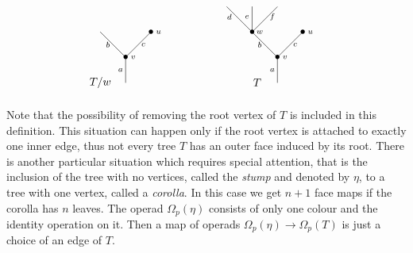 \documentclass[a4paper]{amsart}
\theoremstyle{plain}
\theoremstyle{definition}
\theoremstyle{remark}
\newcommand{\To}{\longrightarrow}
\numberwithin{equation}{section}
\numberwithin{figure}{section}
\begin{document}
\begin{equation}
    \xy<0.08cm,0cm>:
    (-10,0)*=0{}="1";
    (10,0)*=0{\bullet}="2";
    (0,-10)*=0{\bullet}="3";
    (0,-20)*=0{}="4";
    (40,10)*=0{}="5";
    (50,10)*=0{}="6";
    (60,10)*=0{}="7";
    (50,0)*=0{\bullet}="8";
    (70,0)*=0{\bullet}="9";
    (60,-10)*=0{\bullet}="10";
    (60,-20)*=0{}="11";
    (13,0)*{\scriptstyle u};
    (-7,-5)*{\scriptstyle b};
    (7,-5)*{\scriptstyle c};
    (3,-10)*{\scriptstyle v};
    (-2,-15)*{\scriptstyle a};
    (41,6)*{\scriptstyle d};
    (48,6)*{\scriptstyle e};
    (58,6)*{\scriptstyle f};
    (53,-5)*{\scriptstyle b};
    (67,-5)*{\scriptstyle c};
    (63,-10)*{\scriptstyle v};
    (58,-15)*{\scriptstyle a};
    (73,0)*{\scriptstyle u};
    (53,0)*{\scriptstyle w};
    (-10,-20)*=0{T/w};
    (-10,-25)*=0{};
    (52,-20)*=0{T};
    "1";"3" **\dir{-};
    "2";"3" **\dir{-};
    "3";"4" **\dir{-};
    "5";"8" **\dir{-};
    "6";"8" **\dir{-};
    "7";"8" **\dir{-};
    "8";"10" **\dir{-};
    "9";"10" **\dir{-};
    "10";"11" **\dir{-};
    \endxy
    \label{outerface}
\end{equation}

Note that the possibility of removing the root vertex of $T$ is
included in this definition. This situation can happen only if the root vertex is attached to exactly one inner edge, thus
not every tree $T$ has an outer face induced by its root. There is another particular situation which requires special
attention, that is the inclusion of the tree with no vertices, called  the \emph{stump} and denoted by $\eta$, to a tree with one vertex,
called a \emph{corolla}. In this case we get $n+1$ face maps if the corolla has $n$ leaves. The operad $\Omega_p(\eta)$ consists of
only one colour and the identity operation on it. Then a map of operads $\Omega_p(\eta)\To \Omega_p(T)$ is just a choice of an
edge of $T$.
\end{document}
